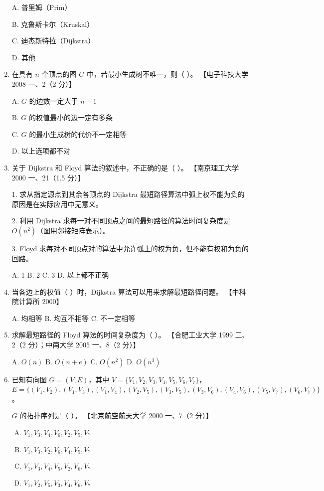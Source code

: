 \documentclass[lang=cn,newtx,10pt,scheme=chinese]{../../elegantbook}
\begin{document}
\begin{enumerate}
        A. 普里姆（Prim）  

        B. 克鲁斯卡尔（Kruskal）  

        C. 迪杰斯特拉（Dijkstra）  

        D. 其他  
    
        \item 在具有 $n$ 个顶点的图 $G$ 中，若最小生成树不唯一，则（ ）。  
        【电子科技大学 2008 一、2（2 分）】 

        A. $G$ 的边数一定大于 $n-1$  

        B. $G$ 的权值最小的边一定有多条  

        C. $G$ 的最小生成树的代价不一定相等  

        D. 以上选项都不对  

        \item 关于 Dijkstra 和 Floyd 算法的叙述中，不正确的是（ ）。  
    【南京理工大学 2000 一、21（1.5 分）】  

    1. 求从指定源点到其余各顶点的 Dijkstra 最短路径算法中弧上权不能为负的原因是在实际应用中无意义。  

    2. 利用 Dijkstra 求每一对不同顶点之间的最短路径的算法时间复杂度是 $O(n^2)$（图用邻接矩阵表示）。

    3. Floyd 求每对不同顶点对的算法中允许弧上的权为负，但不能有权和为负的回路。  

    A. 1 \quad B. 2 \quad C. 3 \quad D. 以上都不正确  

    \item 当各边上的权值（ ）时，Dijkstra 算法可以用来求解最短路径问题。  
    【中科院计算所 2000】  

    A. 均相等 \quad B. 均互不相等 \quad C. 不一定相等  

    \item 求解最短路径的 Floyd 算法的时间复杂度为（ ）。  
    【合肥工业大学 1999 二、2（2 分）；中南大学 2005 一、8（2 分）】  

    A. $O(n)$ \quad B. $O(n+e)$ \quad C. $O(n^2)$ \quad D. $O(n^3)$  

    \item 已知有向图 $G = (V, E)$，其中  
    $V = \{V_1, V_2, V_3, V_4, V_5, V_6, V_7\}$，  
    $E = \{( V_1, V_2) ,  (V_1, V_3) ,  (V_1, V_4) ,  (V_2, V_5) ,  
    (V_3, V_5 ),  (V_3, V_6) ,  (V_4, V_6),  (V_5, V_7),  (V_6, V_7) \}$。  

    $G$ 的拓扑序列是（ ）。  
    【北京航空航天大学 2000 一、7（2 分）】  

    \begin{enumerate}[A.]
        \item $V_1, V_3, V_4, V_6, V_2, V_5, V_7$
        \item $V_1, V_3, V_2, V_6, V_4, V_5, V_7$
        \item $V_1, V_3, V_4, V_5, V_2, V_6, V_7$
        \item $V_1, V_2, V_5, V_3, V_4, V_6, V_7$
    \end{enumerate}


\end{enumerate}
\end{document}
